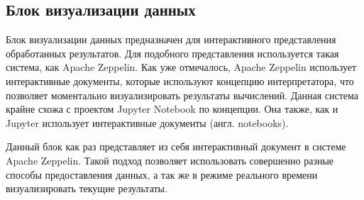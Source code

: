 \subsection{Блок визуализации данных}

Блок визуализации данных предназначен для интерактивного представления обработанных результатов.
Для подобного представления используется такая система, как Apache Zeppelin.
Как уже отмечалось, Apache Zeppelin использует интерактивные документы, которые используют концепцию интерпретатора, что позволяет моментально визуализировать результаты вычислений.
Данная система крайне схожа с проектом Jupyter Notebook по концепции.
Она также, как и Jupyter использует интерактивные документы (англ. notebooks).

Данный блок как раз представляет из себя интерактивный документ в системе Apache Zeppelin.
Такой подход позволяет использовать совершенно разные способы предоставления данных, а так же в режиме реального времени визуализировать текущие результаты.
